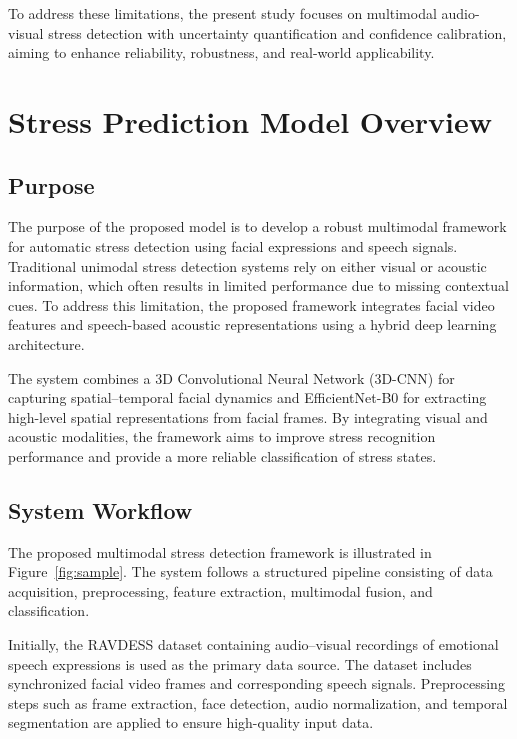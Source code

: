 \documentclass[conference]{IEEEtran}
\begin{document}
To address these limitations, the present study focuses on multimodal audio-visual stress detection with uncertainty quantification and confidence calibration, aiming to enhance reliability, robustness, and real-world applicability.

\section{Stress Prediction Model Overview}

\subsection{Purpose}

The purpose of the proposed model is to develop a robust multimodal framework for automatic stress detection using facial expressions and speech signals. Traditional unimodal stress detection systems rely on either visual or acoustic information, which often results in limited performance due to missing contextual cues. To address this limitation, the proposed framework integrates facial video features and speech-based acoustic representations using a hybrid deep learning architecture.

The system combines a 3D Convolutional Neural Network (3D-CNN) for capturing spatial–temporal facial dynamics and EfficientNet-B0 for extracting high-level spatial representations from facial frames. By integrating visual and acoustic modalities, the framework aims to improve stress recognition performance and provide a more reliable classification of stress states.

\subsection{System Workflow}

The proposed multimodal stress detection framework is illustrated in Figure~\ref{fig:sample}. The system follows a structured pipeline consisting of data acquisition, preprocessing, feature extraction, multimodal fusion, and classification.

Initially, the RAVDESS dataset containing audio–visual recordings of emotional speech expressions is used as the primary data source. The dataset includes synchronized facial video frames and corresponding speech signals. Preprocessing steps such as frame extraction, face detection, audio normalization, and temporal segmentation are applied to ensure high-quality input data.
\end{document}
